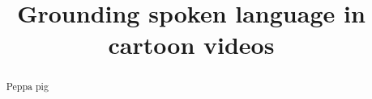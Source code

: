 \documentclass[twoside,11pt]{article}
\begin{document}
\title{Grounding spoken language in cartoon videos}

\author{}
\date{}


\maketitle
\begin{abstract}
  \noindent
Peppa pig
\end{abstract}









\end{document}
